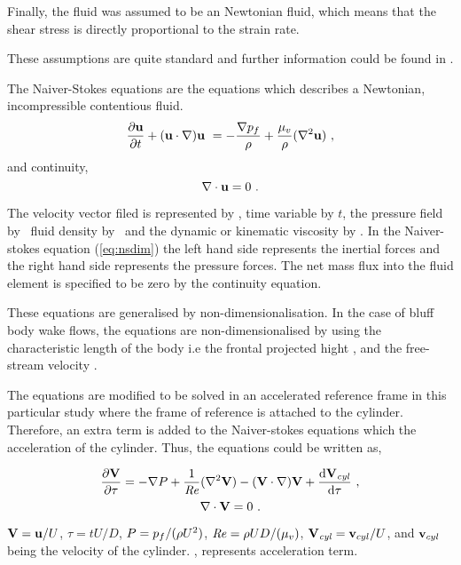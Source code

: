  Finally, the fluid was assumed to be an Newtonian fluid, which means that the shear stress is directly proportional to the strain rate. 
 
 These assumptions are quite standard and further information could be found in \citet{White99}.        

The Naiver-Stokes equations are the equations which describes a Newtonian, incompressible contentious fluid.
  \begin{equation} \centering
  \label{eq:nsdim}
  \pderiv{\vecu}{t} + (\vecu\cdot\nabla)\vecu\ = -\frac{\grad{\pres}}{\density} + \frac{\dynvis}{\density}(\gradsq{\vecu})~,
  \end{equation}
  and continuity,
  \begin{equation} \centering
  \divergence{\vecu} = 0~.
  \end{equation}
  
  The velocity vector filed is represented by \vecu, time variable by $t$, the pressure field by \pres \ fluid density by \density \ and the dynamic or kinematic viscosity by \dynvis. In the Naiver-stokes equation (\ref{eq:nsdim}) the left hand side represents the inertial forces and the right hand side represents the pressure forces. The net mass flux into the fluid element is specified to be zero by the continuity equation. 
  
  These equations are generalised by non-dimensionalisation. In the case of bluff body wake flows, the equations are non-dimensionalised by using the characteristic length of the body i.e the frontal projected hight \diam, and the free-stream velocity \Ufree. 
  
  The equations are modified  to  be solved in an accelerated reference frame in this particular study where the frame of reference is attached to the cylinder. Therefore, an extra term is added to the Naiver-stokes equations which the acceleration of the cylinder. Thus, the equations could be written as, 
  
  \begin{equation} \centering
  \label{eq:nsfinal}
  \pderiv{\vecV}{\tau} = -\grad{\Pres} + \frac{1}{\Rey}(\gradsq{\vecV}) - (\vecV\cdot\nabla)\vecV + \accframe ~,
  \end{equation}
  \begin{equation}
  \label{eq:continuity}
  \nabla\cdot\mathbf{V} = 0~.
  \end{equation}
  
   $\mathbf{V} = \mathbf{u}/U$, $\tau = tU/D$, $P = p_{f}/(\rho
  U^{2})$, $\mathit{Re} = \rho UD/(\mu_{v})$, $\mathbf{V}_{\mathit{cyl}} = \mathbf{v}_{cyl}/U$, and 
  $\mathbf{v}_{cyl}$ being the velocity of the cylinder. \accframe, represents acceleration term.  
  
